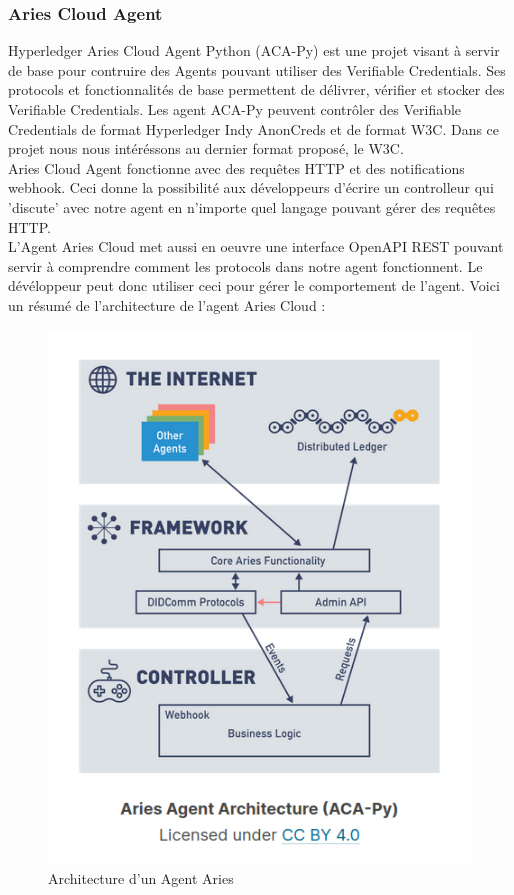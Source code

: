 \documentclass[12pt, openany]{report}
\begin{document}
\subsubsection{Aries Cloud Agent}
\noindent 
\begin{flushleft}
Hyperledger Aries Cloud Agent Python (ACA-Py) est une projet visant à servir de base pour contruire des Agents pouvant utiliser des Verifiable Credentials. Ses protocols et fonctionnalités de base permettent de délivrer, vérifier et stocker des Verifiable Credentials. Les agent ACA-Py peuvent contrôler des Verifiable Credentials de format Hyperledger Indy AnonCreds et de format W3C. Dans ce projet nous nous intéréssons au dernier format proposé, le W3C. \\
Aries Cloud Agent fonctionne avec des requêtes HTTP et des notifications webhook. Ceci donne la possibilité aux développeurs d'écrire un controlleur qui 'discute' avec notre agent en n'importe quel langage pouvant gérer des requêtes HTTP. \\
L'Agent Aries Cloud met aussi en oeuvre une interface OpenAPI REST pouvant servir à comprendre comment les protocols dans notre agent fonctionnent. Le dévéloppeur peut donc utiliser ceci pour gérer le comportement de l'agent. Voici un résumé de l'architecture de l'agent Aries Cloud : \\

\begin{figure}[h]
\includegraphics[scale=0.5]{ACA-py.png}
\centering
\caption{Architecture d'un Agent Aries}
\end{figure}
\end{flushleft}
\end{document}
